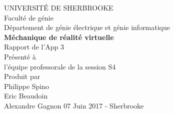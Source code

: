 \documentclass{article}
\begin{document}
\begin{titlepage}   
	\large{
		\begin{center}
			UNIVERSITÉ DE SHERBROOKE\\Faculté de génie\\
			Département de génie électrique et génie informatique\\
			\vspace{3cm}
			{\LARGE\textbf{Méchanique de réalité virtuelle}}\\
			\vspace{2cm}
			\LARGE{Rapport de l'App 3}\\
			\vspace{2cm}
			Présenté à\\l'équipe professorale de la session S4\\
			\vspace{2cm}
			Produit par\\Philippe Spino\\ Eric Beaudoin \\ Alexandre Gagnon
			\vspace{1cm}
			\vfill{07 Juin 2017 - Sherbrooke}
		\end{center}
	}
\end{titlepage}
\section{}
\section{}
\section{}
\end{document}

